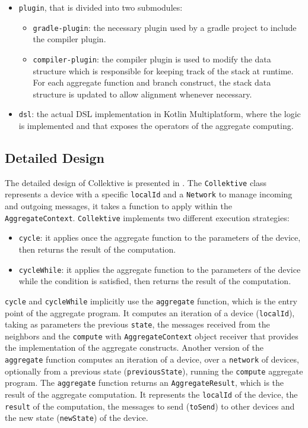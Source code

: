 \begin{itemize}
    \item \texttt{plugin}, that is divided into two submodules:
    \begin{itemize}
        \item \texttt{gradle-plugin}: the necessary plugin used by a gradle project to include the compiler plugin.
        \item \texttt{compiler-plugin}: the compiler plugin is used to modify the data structure which is responsible for keeping track of the stack at runtime. For each aggregate function and branch construct, the stack data structure is updated to allow alignment whenever necessary.
    \end{itemize}
    \item \texttt{dsl}: the actual DSL implementation in Kotlin Multiplatform, where the logic is implemented and that exposes the operators of the aggregate computing.
\end{itemize}

\subsection{Detailed Design}

The detailed design of Collektive is presented in . The \texttt{Collektive} class represents a device with a specific \texttt{localId} and a \texttt{Network} to manage incoming and outgoing messages, it takes a function to apply within the \texttt{AggregateContext}. \texttt{Collektive} implements two different execution strategies:

\begin{itemize}
    \item \texttt{cycle}: it applies once the aggregate function to the parameters of the device, then returns the result of the computation.
    \item \texttt{cycleWhile}: it applies the aggregate function to the parameters of the device while the condition is satisfied, then returns the result of the computation.
\end{itemize}

\texttt{cycle} and \texttt{cycleWhile} implicitly use the \texttt{aggregate} function, which is the entry point of the aggregate program. It computes an iteration of a device (\texttt{localId}), taking as parameters the previous \texttt{state}, the messages received from the neighbors and the \texttt{compute} with \texttt{AggregateContext} object receiver that provides the implementation of the aggregate constructs. Another version of the \texttt{aggregate} function computes an iteration of a device, over a \texttt{network} of devices, optionally from a previous state (\texttt{previousState}), running the \texttt{compute} aggregate program. The \texttt{aggregate} function returns an \texttt{AggregateResult}, which is the result of the aggregate computation. It represents the \texttt{localId} of the device, the \texttt{result} of the computation, the messages to send (\texttt{toSend}) to other devices and the new state (\texttt{newState}) of the device.

